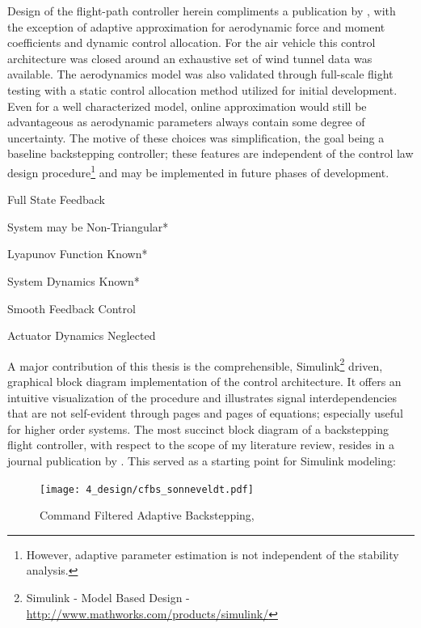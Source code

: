 \documentclass[12pt]{ucthesis}
\begin{document}
Design of the flight-path controller herein compliments a publication by \citet{Farrell2005}, with the exception of adaptive approximation for aerodynamic force and moment coefficients and dynamic control allocation. For the air vehicle this control architecture was closed around an exhaustive set of wind tunnel data was available. The aerodynamics model was also validated through full-scale flight testing with a static control allocation method utilized for initial development. Even for a well characterized model, online approximation would still be advantageous as aerodynamic parameters always contain some degree of uncertainty. The motive of these choices was simplification, the goal being a baseline backstepping controller; these features are independent of the control law design procedure\footnote{However, adaptive parameter estimation is not independent of the stability analysis.} and may be implemented in future phases of development.

\begin{ass} \alignright
\vspace{1em}
	\begin{itemize}[labelindent=\parindent,leftmargin=1in,noitemsep,nosep]
		\begin{minipage}{0.5\linewidth}
			\item Full State Feedback
			\item System may be Non-Triangular*
			\item Lyapunov Function Known*
		\end{minipage}
		\begin{minipage}{0.5\linewidth}
			\item System Dynamics Known*
			\item Smooth Feedback Control
			\item Actuator Dynamics Neglected	
		\end{minipage}
	\end{itemize}
\end{ass}

A major contribution of this thesis is the comprehensible, Simulink\footnote{Simulink - Model Based Design - \url{http://www.mathworks.com/products/simulink/}} driven, graphical block diagram implementation of the control architecture. It offers an intuitive visualization of the procedure and illustrates signal interdependencies that are not self-evident through pages and pages of equations; especially useful for higher order systems. The most succinct block diagram of a backstepping flight controller, with respect to the scope of my literature review, resides in a journal publication by \citet[Figure 1]{Sonneveldt2007}. This served as a starting point for Simulink modeling:
%
\begin{figure}[H]
	\centering
	\texttt{[image: 4\_design/cfbs\_sonneveldt.pdf]}%
	\caption{Command Filtered Adaptive Backstepping, \citet{Sonneveldt2007}}
	\label{fig: cfbs_sonneveldt}
\end{figure}
\end{document}
